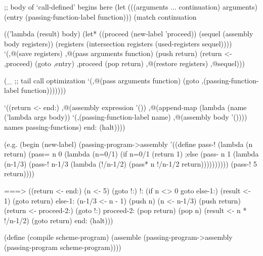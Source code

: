\begin{Snippet}
      ;; body of `call-defined' begins here
      (let (((arguments ... continuation) arguments)
            (entry (passing-function-label function)))
        (match continuation

          (('lambda (result) body)
           (let* ((proceed (new-label 'proceed))
                  (sequel (assembly body registers))
                  (registers (intersection registers
                                  (used-registers sequel))))
             `(,@(save registers)
               ,@(pass arguments function)
	       (push return)
	       (return <- ,proceed)
               (goto ,entry)
               ,proceed
	       (pop return)
               ,@(restore registers)
               ,@sequel)))

          (_ ;; tail call optimization
           `(,@(pass arguments function)
	     (goto ,(passing-function-label function)))))))

    `((return <- end:)
      ,@(assembly expression '())
      ,@(append-map (lambda (name ('lambda args body))
		      `(,(passing-function-label name)
			,@(assembly body '())))
		    names passing-functions)
      end:
      (halt))))
\end{Snippet}
\begin{Snippet}
(e.g.
 (begin
   (new-label)
   (passing-program->assembly
    '((define pass-!
	(lambda (n return)
	  (pass= n 0
	    (lambda (n=0/1)
	      (if n=0/1
		  (return 1)
	      ;else
		  (pass- n 1
		    (lambda (n-1/3)
		      (pass-! n-1/3
		        (lambda (!/n-1/2)
			  (pass* n !/n-1/2
			    return))))))))))
      (pass-! 5 return))))
\end{Snippet}
\begin{Snippet}
 ===> ((return <- end:)
       (n <- 5)
       (goto !:)
     !:
       (if n <> 0 goto else-1:)
       (result <- 1)
       (goto return)
     else-1:
       (n-1/3 <- n - 1)
       (push n)
       (n <- n-1/3)
       (push return)
       (return <- proceed-2:)
       (goto !:)
     proceed-2:
       (pop return)
       (pop n)
       (result <- n * !/n-1/2)
       (goto return)
     end:
       (halt)))
\end{Snippet}
\begin{Snippet}
(define (compile scheme-program)
  (assemble (passing-program->assembly
	     (passing-program scheme-program))))
\end{Snippet}

